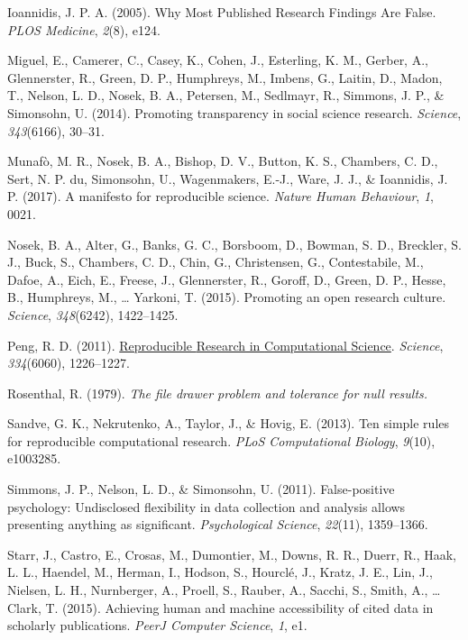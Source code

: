 \documentclass[
  a4paper,
]{article}
\newlength{\cslhangindent}
\newenvironment{CSLReferences}[2] %
 {\begin{list}{}{%
  \setlength{\itemindent}{0pt}
  \setlength{\leftmargin}{0pt}
  \setlength{\parsep}{0pt}
  \ifodd #1
   \setlength{\leftmargin}{\cslhangindent}
   \setlength{\itemindent}{-1\cslhangindent}
  \fi
  \setlength{\itemsep}{#2\baselineskip}}}
 {\end{list}}
\begin{document}
\begin{CSLReferences}{1}{0}
Ioannidis, J. P. A. (2005). Why {Most Published Research Findings Are
False}. \emph{PLOS Medicine}, \emph{2}(8), e124.

Miguel, E., Camerer, C., Casey, K., Cohen, J., Esterling, K. M., Gerber,
A., Glennerster, R., Green, D. P., Humphreys, M., Imbens, G., Laitin,
D., Madon, T., Nelson, L. D., Nosek, B. A., Petersen, M., Sedlmayr, R.,
Simmons, J. P., \& Simonsohn, U. (2014). Promoting transparency in
social science research. \emph{Science}, \emph{343}(6166), 30--31.

Munafò, M. R., Nosek, B. A., Bishop, D. V., Button, K. S., Chambers, C.
D., Sert, N. P. du, Simonsohn, U., Wagenmakers, E.-J., Ware, J. J., \&
Ioannidis, J. P. (2017). A manifesto for reproducible science.
\emph{Nature Human Behaviour}, \emph{1}, 0021.

Nosek, B. A., Alter, G., Banks, G. C., Borsboom, D., Bowman, S. D.,
Breckler, S. J., Buck, S., Chambers, C. D., Chin, G., Christensen, G.,
Contestabile, M., Dafoe, A., Eich, E., Freese, J., Glennerster, R.,
Goroff, D., Green, D. P., Hesse, B., Humphreys, M., \ldots{} Yarkoni, T.
(2015). Promoting an open research culture. \emph{Science},
\emph{348}(6242), 1422--1425.

Peng, R. D. (2011).
\href{https://www.ncbi.nlm.nih.gov/pubmed/22144613}{Reproducible
{Research} in {Computational Science}}. \emph{Science},
\emph{334}(6060), 1226--1227.

Rosenthal, R. (1979). \emph{The file drawer problem and tolerance for
null results.}

Sandve, G. K., Nekrutenko, A., Taylor, J., \& Hovig, E. (2013). Ten
simple rules for reproducible computational research. \emph{PLoS
Computational Biology}, \emph{9}(10), e1003285.

Simmons, J. P., Nelson, L. D., \& Simonsohn, U. (2011). False-positive
psychology: {Undisclosed} flexibility in data collection and analysis
allows presenting anything as significant. \emph{Psychological Science},
\emph{22}(11), 1359--1366.

Starr, J., Castro, E., Crosas, M., Dumontier, M., Downs, R. R., Duerr,
R., Haak, L. L., Haendel, M., Herman, I., Hodson, S., Hourclé, J.,
Kratz, J. E., Lin, J., Nielsen, L. H., Nurnberger, A., Proell, S.,
Rauber, A., Sacchi, S., Smith, A., \ldots{} Clark, T. (2015). Achieving
human and machine accessibility of cited data in scholarly publications.
\emph{PeerJ Computer Science}, \emph{1}, e1.


\end{CSLReferences}
\end{document}
